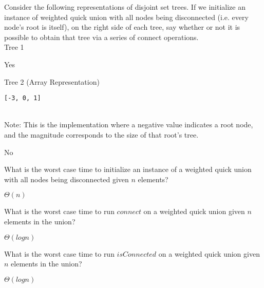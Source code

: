Consider the following representations of disjoint set trees. If we initialize an instance of weighted quick union with all nodes being disconnected (i.e. every node's root is itself), on the right side of each tree, say whether or not it is possible to obtain that tree via a series of connect operations.\\

\question Tree 1\\
\begin{solution}
Yes
\end{solution}

\question Tree 2 (Array Representation) \\
\begin{lstlisting}
[-3, 0, 1]
\end{lstlisting}\\

Note: This is the implementation where a negative value indicates a root node, and the magnitude corresponds to the size of that root's tree.
\begin{solution}
No
\end{solution}
\question What is the worst case time to initialize an instance of a weighted quick union with all nodes being disconnected given $n$ elements?
\begin{solution}
$\Theta(n)$
\end{solution}
\question What is the worst case time to run $connect$ on a weighted quick union given $n$ elements in the union?
\begin{solution}
$\Theta(log n)$
\end{solution}
\question What is the worst case time to run $isConnected$ on a weighted quick union given $n$ elements in the union?
\begin{solution}
$\Theta(log n)$
\end{solution}